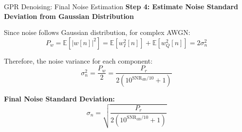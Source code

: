 \documentclass[aspectratio=169]{beamer}
\begin{document}
\begin{frame}{GPR Denoising: Final Noise Estimation}
\textbf{Step 4: Estimate Noise Standard Deviation from Gaussian Distribution}

Since noise follows Gaussian distribution, for complex AWGN:
\begin{equation}
P_w = \mathbb{E}[|w[n]|^2] = \mathbb{E}[w_I^2[n]] + \mathbb{E}[w_Q^2[n]] = 2\sigma_n^2
\end{equation}

Therefore, the noise variance for each component:
\begin{equation}
\sigma_n^2 = \frac{P_w}{2} = \frac{P_r}{2(10^{\text{SNR}_{\text{dB}}/10} + 1)}
\end{equation}

\vspace{0.3cm}
\textbf{Final Noise Standard Deviation:}
\begin{equation}
\boxed{\sigma_n = \sqrt{\frac{P_r}{2(10^{\text{SNR}_{\text{dB}}/10} + 1)}}}
\end{equation}

\vspace{0.5cm}
\begin{center}
\end{center}
\end{frame}
\end{document}
